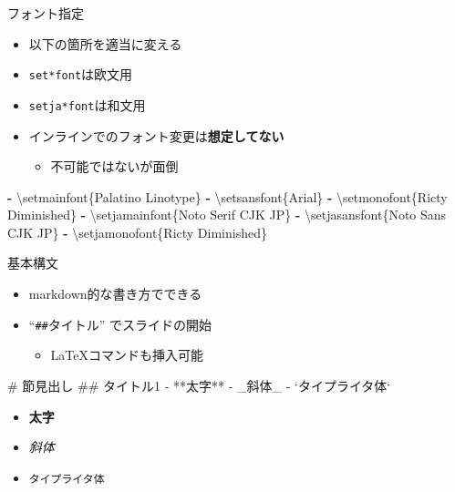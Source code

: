 \documentclass[
  14pt,
  ignorenonframetext,
]{beamer}
\newenvironment{Shaded}{\begin{snugshade}}{\end{snugshade}}
\newcommand{\AttributeTok}[1]{\textcolor[rgb]{0.77,0.63,0.00}{#1}}
\newcommand{\BaseNTok}[1]{\textcolor[rgb]{0.00,0.00,0.81}{#1}}
\newcommand{\FunctionTok}[1]{\textcolor[rgb]{0.00,0.00,0.00}{#1}}
\newcommand{\KeywordTok}[1]{\textcolor[rgb]{0.13,0.29,0.53}{\textbf{#1}}}
\newcommand{\NormalTok}[1]{#1}
\newcommand{\StringTok}[1]{\textcolor[rgb]{0.31,0.60,0.02}{#1}}
\providecommand{\tightlist}{%
  \setlength{\itemsep}{0pt}\setlength{\parskip}{0pt}}
\begin{document}
\begin{frame}[fragile]{フォント指定}
\protect\hypertarget{ux30d5ux30a9ux30f3ux30c8ux6307ux5b9a}{}

\begin{itemize}
\tightlist
\item
  以下の箇所を適当に変える
\item
  \texttt{set*font}は欧文用
\item
  \texttt{setja*font}は和文用
\item
  インラインでのフォント変更は\textbf{想定してない}

  \begin{itemize}
  \tightlist
  \item
    不可能ではないが面倒
  \end{itemize}
\end{itemize}

\begin{Shaded}
\begin{Highlighting}[]
\KeywordTok{-}\AttributeTok{ \textbackslash{}setmainfont\{Palatino Linotype\}}
\KeywordTok{-}\AttributeTok{ \textbackslash{}setsansfont\{Arial\}}
\KeywordTok{-}\AttributeTok{ \textbackslash{}setmonofont\{Ricty Diminished\}}
\KeywordTok{-}\AttributeTok{ \textbackslash{}setjamainfont\{Noto Serif CJK JP\}}
\KeywordTok{-}\AttributeTok{ \textbackslash{}setjasansfont\{Noto Sans CJK JP\}}
\KeywordTok{-}\AttributeTok{ \textbackslash{}setjamonofont\{Ricty Diminished\}}
\end{Highlighting}
\end{Shaded}

\end{frame}

\begin{frame}[fragile]{基本構文}
\protect\hypertarget{ux57faux672cux69cbux6587}{}

\begin{itemize}
\tightlist
\item
  markdown的な書き方でできる
\item
  ``\texttt{\#\#}タイトル'' でスライドの開始

  \begin{itemize}
  \tightlist
  \item
    \LaTeX コマンドも挿入可能
  \end{itemize}
\end{itemize}

\begin{Shaded}
\begin{Highlighting}[]
\FunctionTok{# 節見出し}
\FunctionTok{## タイトル1}
\NormalTok{- **太字**}
\NormalTok{- }\StringTok{_斜体_}
\StringTok{- }\BaseNTok{`タイプライタ体`}
\end{Highlighting}
\end{Shaded}

\begin{itemize}
\tightlist
\item
  \textbf{太字}
\item
  \emph{斜体}
\item
  \texttt{タイプライタ体}
\end{itemize}

\end{frame}
\end{document}
